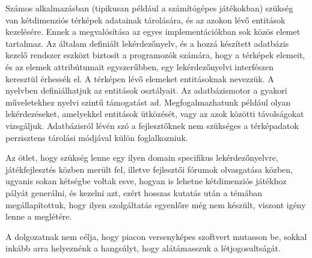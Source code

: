 
Számos alkalmazásban (tipikusan például a számítógépes játékokban) szükség  van kétdimenziós térképek adatainak tárolására, és az azokon lévő entitások kezelésére. Ennek a megvalósítása az egyes implementációkban sok közös elemet tartalmaz. Az általam definiált lekérdezőnyelv, és a hozzá készített adatbázis kezelő rendszer eszközt biztosít a programozók számára, hogy a térképek elemeit, és az elemek attribútumait egyszerűbben, egy lekérdezőnyelvi interfészen keresztül érhessék el. A térképen lévő elemeket entitásoknak nevezzük. A nyelvben definiálhatjuk az entitások osztályait. Az adatbázismotor a gyakori műveletekhez nyelvi szintű támogatást ad. Megfogalmazhatunk például olyan lekérdezéseket, amelyekkel entitások ütközését, vagy az azok közötti távolságokat vizsgáljuk. Adatbázisról lévén szó a fejlesztőknek nem szükséges a térképadatok perzisztens tárolási módjával külön foglalkozniuk.

Az ötlet, hogy szükség lenne egy ilyen domain specifikus lekérdezőnyelvre, játékfejlesztés közben merült fel, illetve fejlesztői fórumok olvasgatása közben, ugyanis sokan kétségbe voltak esve, hogyan is lehetne kétdimenziós játékhoz pályát generálni, és kezelni azt, ezért hosszas kutatás után a témában megállapítottuk, hogy ilyen szolgáltatás egyenlőre még nem készült, viszont igény lenne a meglétére.

A dolgozatnak nem célja, hogy piacon versenyképes szoftvert mutasson be, sokkal inkább arra helyeznénk a hangsúlyt, hogy alátámasszuk a létjogosultságát.